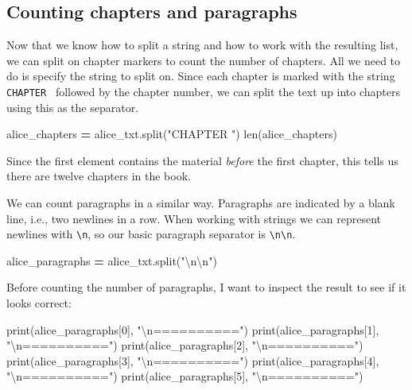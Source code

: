\documentclass[]{book}
\newenvironment{Shaded}{\begin{snugshade}}{\end{snugshade}}
\newcommand{\DecValTok}[1]{\textcolor[rgb]{0.00,0.00,0.81}{#1}}
\newcommand{\CharTok}[1]{\textcolor[rgb]{0.31,0.60,0.02}{#1}}
\newcommand{\StringTok}[1]{\textcolor[rgb]{0.31,0.60,0.02}{#1}}
\newcommand{\OperatorTok}[1]{\textcolor[rgb]{0.81,0.36,0.00}{\textbf{#1}}}
\newcommand{\BuiltInTok}[1]{#1}
\newcommand{\NormalTok}[1]{#1}
\begin{document}
\subsection{Counting chapters and
paragraphs}\label{counting-chapters-and-paragraphs}

Now that we know how to split a string and how to work with the
resulting list, we can split on chapter markers to count the number of
chapters. All we need to do is specify the string to split on. Since
each chapter is marked with the string
\texttt{\textquotesingle{}CHAPTER\ \textquotesingle{}} followed by the
chapter number, we can split the text up into chapters using this as the
separator.

\begin{Shaded}
\begin{Highlighting}[]
\NormalTok{alice_chapters }\OperatorTok{=}\NormalTok{ alice_txt.split(}\StringTok{"CHAPTER "}\NormalTok{)}
\BuiltInTok{len}\NormalTok{(alice_chapters)}
\end{Highlighting}
\end{Shaded}

Since the first element contains the material \emph{before} the first
chapter, this tells us there are twelve chapters in the book.

We can count paragraphs in a similar way. Paragraphs are indicated by a
blank line, i.e., two newlines in a row. When working with strings we
can represent newlines with \texttt{\textbackslash{}n}, so our basic
paragraph separator is \texttt{\textbackslash{}n\textbackslash{}n}.

\begin{Shaded}
\begin{Highlighting}[]
\NormalTok{alice_paragraphs }\OperatorTok{=}\NormalTok{ alice_txt.split(}\StringTok{"}\CharTok{\textbackslash{}n\textbackslash{}n}\StringTok{"}\NormalTok{)}
\end{Highlighting}
\end{Shaded}

Before counting the number of paragraphs, I want to inspect the result
to see if it looks correct:

\begin{Shaded}
\begin{Highlighting}[]
\BuiltInTok{print}\NormalTok{(alice_paragraphs[}\DecValTok{0}\NormalTok{], }\StringTok{"}\CharTok{\textbackslash{}n}\StringTok{=========="}\NormalTok{)}
\BuiltInTok{print}\NormalTok{(alice_paragraphs[}\DecValTok{1}\NormalTok{], }\StringTok{"}\CharTok{\textbackslash{}n}\StringTok{=========="}\NormalTok{)}
\BuiltInTok{print}\NormalTok{(alice_paragraphs[}\DecValTok{2}\NormalTok{], }\StringTok{"}\CharTok{\textbackslash{}n}\StringTok{=========="}\NormalTok{)}
\BuiltInTok{print}\NormalTok{(alice_paragraphs[}\DecValTok{3}\NormalTok{], }\StringTok{"}\CharTok{\textbackslash{}n}\StringTok{=========="}\NormalTok{)}
\BuiltInTok{print}\NormalTok{(alice_paragraphs[}\DecValTok{4}\NormalTok{], }\StringTok{"}\CharTok{\textbackslash{}n}\StringTok{=========="}\NormalTok{)}
\BuiltInTok{print}\NormalTok{(alice_paragraphs[}\DecValTok{5}\NormalTok{], }\StringTok{"}\CharTok{\textbackslash{}n}\StringTok{=========="}\NormalTok{)}
\end{Highlighting}
\end{Shaded}
\end{document}
